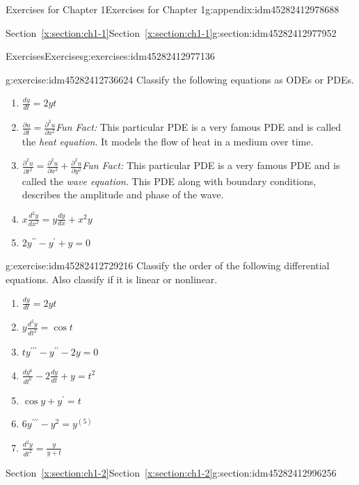 \documentclass[oneside,10pt,]{book}
\numberwithin{equation}{section}
\numberwithin{equation}{section}
\begin{document}
\begin{appendixptx}{Exercises for Chapter 1}{}{Exercises for Chapter 1}{}{}{g:appendix:idm45282412978688}
\begin{sectionptx}{Section~\ref*{x:section:ch1-1}}{}{Section~\ref*{x:section:ch1-1}}{}{}{g:section:idm45282412977952}
\begin{exercises-subsection-numberless}{Exercises}{}{Exercises}{}{}{g:exercises:idm45282412977136}
\begin{divisionexercise}{6}{}{}{g:exercise:idm45282412736624}
Classify the following equations as ODEs or PDEs. %
\begin{enumerate}[label=(\alph*)]
\item{}\(\frac{dy}{dt}=2yt\)%
\item{}\(\frac{\partial u}{\partial t}=\frac{\partial^{2}u}{\partial x^{2}}\)\emph{Fun Fact:} This particular PDE is a very famous PDE and is called the \emph{heat equation}. It models the flow of heat in a medium over time.%
\item{}\(\frac{\partial^{2}u}{\partial t^{2}}=\frac{\partial^{2}u}{\partial x^{2}}+\frac{\partial^{2}u}{\partial y^{2}}\)\emph{Fun Fact:} This particular PDE is a very famous PDE and is called the \emph{wave equation}. This PDE along with boundary conditions, describes the amplitude and phase of the wave.%
\item{}\(x\frac{d^{2}y}{dx^{2}}=y\frac{dy}{dx}+x^{2}y\)%
\item{}\(2y^{\prime\prime}-y^{\prime}+y=0\)%
\end{enumerate}
\end{divisionexercise}%
\begin{divisionexercise}{7}{}{}{g:exercise:idm45282412729216}%
Classify the order of the following differential equations. Also classify if it is linear or nonlinear. %
\begin{enumerate}[label=(\alph*)]
\item{}\(\frac{dy}{dt}=2yt\)%
\item{}\(y\frac{d^{2}y}{dt^{2}}=\cos t\)%
\item{}\(ty^{\prime\prime\prime}-y^{\prime\prime}-2y=0\)%
\item{}\(\frac{dy^{6}}{dt^{6}}-2\frac{dy}{dt}+y=t^{2}\)%
\item{}\(\cos y+y^{\prime}=t\)%
\item{}\(6y^{\prime\prime\prime}-y^{2}=y^{(5)}\)%
\item{}\(\frac{d^{2}y}{dt^{2}}=\frac{y}{y+t}\)%
\end{enumerate}
\end{divisionexercise}%
\end{exercises-subsection-numberless}
\end{sectionptx}
%
%
\typeout{************************************************}
\typeout{************************************************}
%
\begin{sectionptx}{Section~\ref*{x:section:ch1-2}}{}{Section~\ref*{x:section:ch1-2}}{}{}{g:section:idm45282412996256}
%
%
\typeout{************************************************}

\end{sectionptx}
\end{appendixptx}
\end{document}
